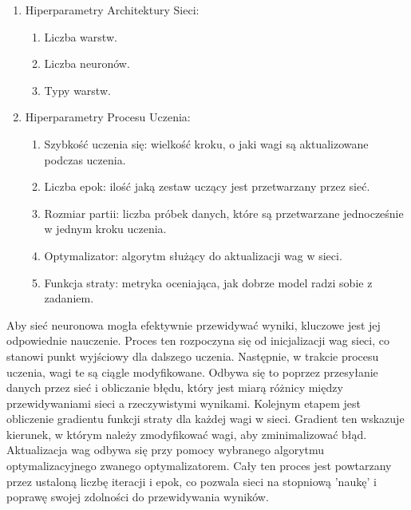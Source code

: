 \documentclass[a4paper,twoside,12pt]{book}
\begin{document}
\begin{enumerate}
  \item Hiperparametry Architektury Sieci:
        \begin{enumerate}
          \item Liczba warstw.
          \item Liczba neuronów.
          \item Typy warstw.
        \end{enumerate}
  \item Hiperparametry Procesu Uczenia:
        \begin{enumerate}
          \item Szybkość uczenia się: wielkość kroku, o jaki wagi są aktualizowane podczas uczenia.
          \item Liczba epok: ilość jaką zestaw uczący jest przetwarzany przez sieć.
          \item Rozmiar partii: liczba próbek danych, które są przetwarzane jednocześnie w jednym kroku uczenia.
          \item Optymalizator: algorytm służący do aktualizacji wag w sieci.
          \item Funkcja straty: metryka oceniająca, jak dobrze model radzi sobie z zadaniem.
        \end{enumerate}
\end{enumerate}

Aby sieć neuronowa mogła efektywnie przewidywać wyniki, kluczowe jest jej odpowiednie nauczenie. Proces ten rozpoczyna się od inicjalizacji wag sieci, co stanowi punkt wyjściowy dla dalszego uczenia. Następnie, w trakcie procesu uczenia, wagi te są ciągle modyfikowane. Odbywa się to poprzez przesyłanie danych przez sieć i obliczanie błędu, który jest miarą różnicy między przewidywaniami sieci a rzeczywistymi wynikami. Kolejnym etapem jest obliczenie gradientu funkcji straty dla każdej wagi w sieci. Gradient ten wskazuje kierunek, w którym należy zmodyfikować wagi, aby zminimalizować błąd. Aktualizacja wag odbywa się przy pomocy wybranego algorytmu optymalizacyjnego zwanego optymalizatorem. Cały ten proces jest powtarzany przez ustaloną liczbę iteracji i epok, co pozwala sieci na stopniową 'naukę' i poprawę swojej zdolności do przewidywania wyników.\cite{bib:ksiazka_sieci_algorytmy}
\end{document}
